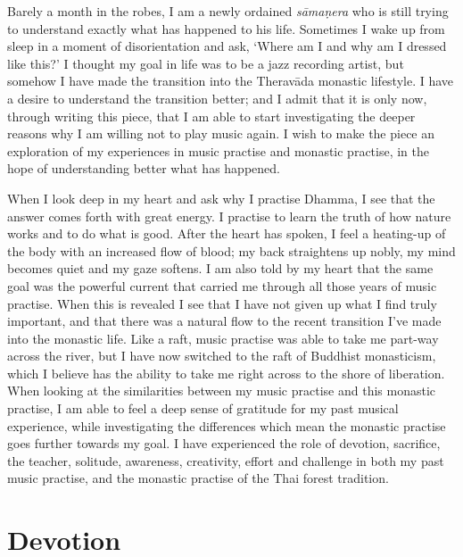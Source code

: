 
Barely a month in the robes, I am a newly ordained \emph{sāmaṇera} who
is still trying to understand exactly what has happened to his life. 
Sometimes I wake up from sleep in a moment of disorientation and ask, 
`Where am I and why am I dressed like this?' I thought my goal in life
was to be a jazz recording artist, but somehow I have made the
transition into the Theravāda  monastic lifestyle. I have a desire to
understand the transition better; and I admit that it is only now, 
through writing this piece, that I am able to start investigating the
deeper reasons why I am willing not to play music again. I wish to make
the piece an exploration of my experiences in music practise and
monastic practise, in the hope of understanding better what has
happened. 

When I look deep in my heart and ask why I practise Dhamma, I see that
the answer comes forth with great energy. I practise to learn the truth
of how nature works and to do what is good. After the heart has spoken, 
I feel a heating-up of the body with an increased flow of blood; my back
straightens up nobly, my mind becomes quiet and my gaze softens. I am
also told by my heart that the same goal was the powerful current that
carried me through all those years of music practise. When this is
revealed I see that I have not given up what I find truly important, and
that there was a natural flow to the recent transition I've made into
the monastic life. Like a raft, music practise was able to take me
part-way across the river, but I have now switched to the raft of
Buddhist monasticism, which I believe has the ability to take me right
across to the shore of liberation. When looking at the similarities
between my music practise and this monastic practise, I am able to feel
a deep sense of gratitude for my past musical experience, while
investigating the differences which mean the monastic practise goes
further towards my goal. I have experienced the role of devotion, 
sacrifice, the teacher, solitude, awareness, creativity, effort and
challenge in both my past music practise, and the monastic practise of
the Thai forest tradition. 

\section{Devotion}


